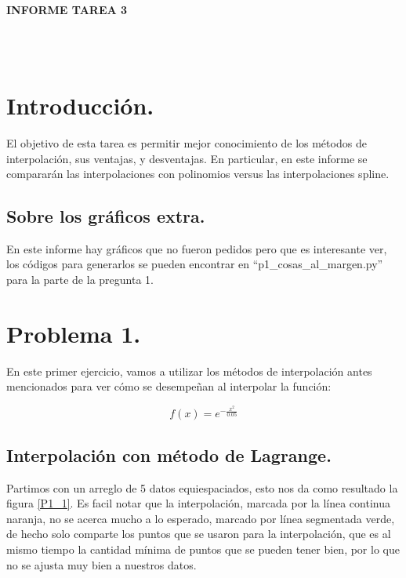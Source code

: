 \documentclass[letter, 11pt]{article}
\begin{document}
\thispagestyle{firstpage}

\begin{center}
  {\uppercase{\LARGE \bf Informe Tarea 3}}
\end{center}

\\
\\


\section{Introducción.}

El objetivo de esta tarea es permitir mejor conocimiento
de los métodos de interpolación, sus ventajas, y
desventajas. En particular, en este informe se compararán
las interpolaciones con polinomios versus las
interpolaciones spline.

\subsection{Sobre los gráficos extra.}

En este informe hay gráficos que no fueron pedidos pero que es interesante ver, los códigos para generarlos se pueden encontrar en ``p1\_cosas\_al\_margen.py'' para la parte de la pregunta 1.


\section{Problema 1.}

En este primer ejercicio, vamos a utilizar los métodos de interpolación antes mencionados para ver cómo se desempeñan al interpolar la función:

\begin{equation}
  f(x)=e^{-\frac{x^2}{0.05}}
\end{equation}

\subsection{Interpolación con método de Lagrange.}

Partimos con un arreglo de 5 datos equiespaciados, esto nos da
como resultado la figura \ref{P1_1}. Es facil notar que la
interpolación, marcada por la línea continua naranja, no se
acerca mucho a lo esperado, marcado por línea segmentada verde,
de hecho solo comparte los puntos que se usaron para la
interpolación, que es al mismo tiempo la cantidad mínima de
puntos que se pueden tener bien, por lo que no se ajusta muy
bien a nuestros datos.
\end{document}
